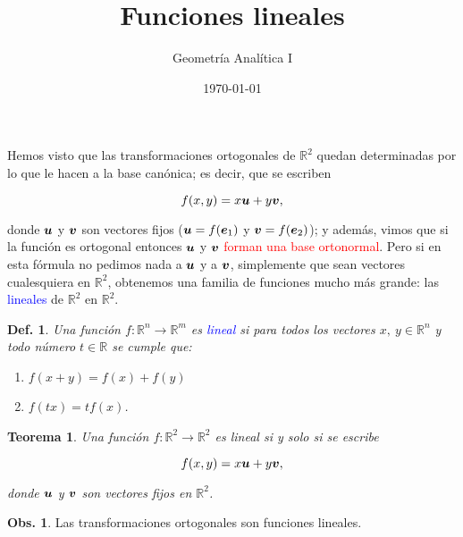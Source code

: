 \documentclass{article}
\title{\Huge{Funciones lineales}}
\author{Geometría Analítica I}
\date{\today}
\theoremstyle{definicion}
\newtheorem{definicion}{Def.}
\theoremstyle{definition}             %
\theoremstyle{definition}             %
\theoremstyle{definition}
\theoremstyle{definition}
\theoremstyle{observacion}
\newtheorem{obs}{Obs.}
\theoremstyle{definition}
\theoremstyle{plain}
\newtheorem{theorem}{Teorema}
\theoremstyle{definition}
\theoremstyle{afirmacion}
\theoremstyle{notation}
\theoremstyle{definition}
\begin{document}
    \maketitle

    Hemos visto que las transformaciones ortogonales de \(\mathbb{R}^{2}\) quedan determinadas por lo que le hacen a la base canónica; es decir, que se escriben

    \begin{equation*}
        f(x, y) = x\vb*{u} + y\vb*{v},
    \end{equation*}

    donde \(\vb*{u}\) y \(\vb*{v}\) son vectores fijos (\(\vb*{u} = f(\vb*{e}_{1})\) y \(\vb*{v} = f(\vb*{e}_{2})\)); y además, vimos que si la función es ortogonal entonces \(\vb*{u}\) y \(\vb*{v}\) \textcolor{red}{forman una base ortonormal}. Pero si en esta fórmula no pedimos nada a \(\vb*{u}\) y a \(\vb*{v}\), simplemente que sean vectores cualesquiera en \(\mathbb{R}^{2}\), obtenemos una familia de funciones mucho más grande: las \textcolor{blue}{lineales} de \(\mathbb{R}^{2}\) en \(\mathbb{R}^{2}\).

    \begin{definicion}
        Una función \(f \colon \mathbb{R}^{n} \to \mathbb{R}^{m}\) es \textcolor{blue}{lineal} si para todos los vectores \(x,\ y\in \mathbb{R}^{n}\) y todo número \(t\in\mathbb{R}\) se cumple que:

        \begin{enumerate}[label = \Roman*)]
            \item \(f(x + y) = f(x) + f(y)\)
            \item \(f(tx) = tf(x)\).
        \end{enumerate}
    \end{definicion}

    \begin{theorem}
        Una función \(f \colon \mathbb{R}^{2} \to \mathbb{R}^{2}\) es lineal si y solo si se escribe

        \begin{equation*}
            f(x, y) = x\vb*{u} + y\vb*{v},
        \end{equation*}

        donde \(\vb*{u}\) y \(\vb*{v}\) son vectores fijos en \(\mathbb{R}^{2}\).
    \end{theorem}

    \begin{obs}
        Las transformaciones ortogonales son funciones lineales.
    \end{obs}
\end{document}
